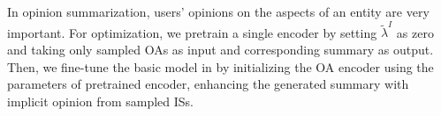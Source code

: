 In opinion summarization, users' opinions on the aspects of an entity are very important. For optimization, we pretrain a single encoder by setting $\widetilde{\lambda}^I$ as zero and
taking only sampled OAs as input and corresponding summary as output.
Then, we fine-tune the basic model in  by initializing the OA encoder using the parameters of pretrained encoder, 
enhancing the generated summary with implicit opinion from sampled ISs.




